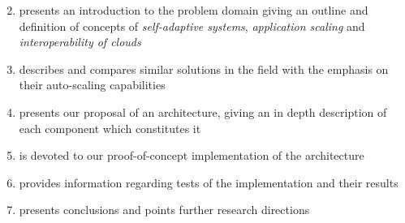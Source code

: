 \begin{enumerate}
    \setcounter{enumi}{1}
  \item presents an introduction to the problem domain giving an outline and definition of concepts of \emph{self-adaptive systems}, \emph{application scaling} and \emph{interoperability of clouds}
  \item describes and compares similar solutions in the field with the emphasis on their auto-scaling capabilities
  \item presents our proposal of an architecture, giving an in depth description of each component which constitutes it
  \item is devoted to our proof-of-concept implementation of the architecture
  \item provides information regarding tests of the implementation and their results
  \item presents conclusions and points further research directions
\end{enumerate}


